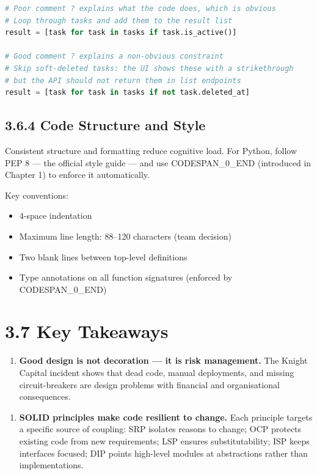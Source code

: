 \documentclass[11pt,a4paper]{book}
\begin{document}
\begin{lstlisting}[language=Python]
# Poor comment ? explains what the code does, which is obvious
# Loop through tasks and add them to the result list
result = [task for task in tasks if task.is_active()]

# Good comment ? explains a non-obvious constraint
# Skip soft-deleted tasks: the UI shows these with a strikethrough
# but the API should not return them in list endpoints
result = [task for task in tasks if not task.deleted_at]
\end{lstlisting}

\subsection{3.6.4 Code Structure and Style}

Consistent structure and formatting reduce cognitive load. For Python, follow PEP 8 --- the official style guide --- and use CODESPAN\_0\_END (introduced in Chapter 1) to enforce it automatically.

Key conventions:
\begin{itemize}
  \item 4-space indentation
  \item Maximum line length: 88--120 characters (team decision)
  \item Two blank lines between top-level definitions
  \item Type annotations on all function signatures (enforced by CODESPAN\_0\_END)
\end{itemize}

\medskip

\section{3.7 Key Takeaways}

\begin{enumerate}
  \item \textbf{Good design is not decoration --- it is risk management.} The Knight Capital incident shows that dead code, manual deployments, and missing circuit-breakers are design problems with financial and organisational consequences.
\end{enumerate}

\begin{enumerate}
  \item \textbf{SOLID principles make code resilient to change.} Each principle targets a specific source of coupling: SRP isolates reasons to change; OCP protects existing code from new requirements; LSP ensures substitutability; ISP keeps interfaces focused; DIP points high-level modules at abstractions rather than implementations.
\end{enumerate}
\end{document}
